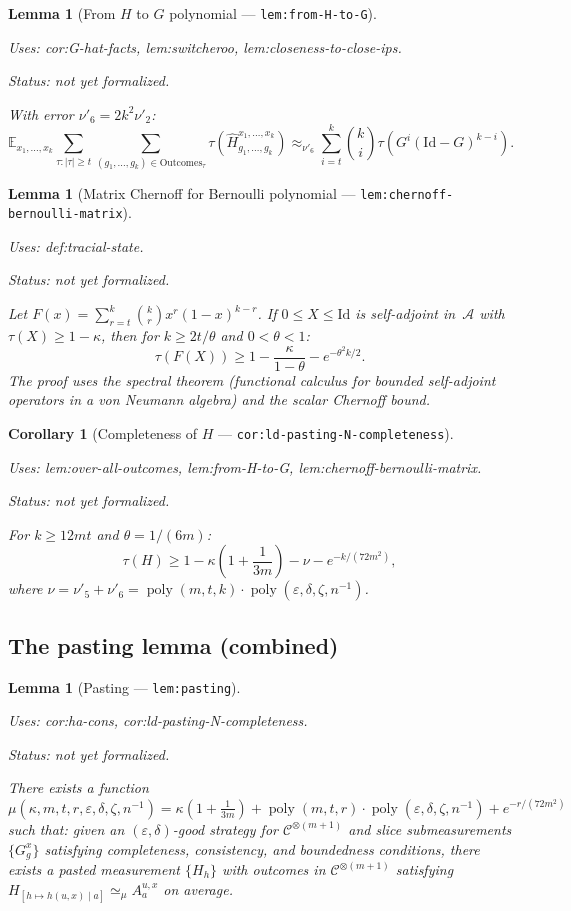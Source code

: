 \documentclass{article}
\providecommand{\uses}[1]{\par\smallskip\noindent\emph{Uses:} #1.\par\smallskip}
\providecommand{\notready}{\par\smallskip\noindent\emph{Status: not yet formalized.}\par\smallskip}
\newtheorem{lemma}[definition]{Lemma}
\newtheorem{corollary}[definition]{Corollary}
\theoremstyle{remark}
\newcommand{\E}{\mathbb{E}}
\newcommand{\id}{\mathrm{Id}}
\newcommand{\code}{\mathcal{C}}
\newcommand{\algebra}{\mathcal{A}}
\newcommand{\eps}{\varepsilon}
\begin{document}
\begin{lemma}[From $H$ to $G$ polynomial --- \texttt{lem:from-H-to-G}]
	\label{lem:from-H-to-G}
	\uses{cor:G-hat-facts, lem:switcheroo, lem:closeness-to-close-ips}
	\notready
	With error $\nu'_6=2k^2\nu'_2$:
	\[
		\E_{x_1,\dots,x_k}\sum_{\tau:|\tau|\ge t}
		\sum_{(g_1,\dots,g_k)\in\mathrm{Outcomes}_\tau}
		\tau\!(\widehat{H}^{x_1,\dots,x_k}_{g_1,\dots,g_k})
		\approx_{\nu'_6}
		\sum_{i=t}^k\binom{k}{i}\tau\!(G^i(\id-G)^{k-i}).
	\]
\end{lemma}

\begin{lemma}[Matrix Chernoff for Bernoulli polynomial --- \texttt{lem:chernoff-bernoulli-matrix}]
	\label{lem:chernoff-bernoulli-matrix}
	\uses{def:tracial-state}
	\notready
	Let $F(x)=\sum_{r=t}^k\binom{k}{r}x^r(1-x)^{k-r}$. If
	$0\le X\le\id$ is self-adjoint in~$\algebra$ with $\tau(X)\ge 1-\kappa$,
	then for $k\ge 2t/\theta$ and $0<\theta<1$:
	\[
		\tau(F(X))\ge 1-\frac\kappa{1-\theta}-e^{-\theta^2 k/2}.
	\]
	The proof uses the spectral theorem (functional calculus for bounded
	self-adjoint operators in a von Neumann algebra) and the scalar Chernoff bound.
\end{lemma}

\begin{corollary}[Completeness of $H$ --- \texttt{cor:ld-pasting-N-completeness}]
	\label{cor:ld-pasting-N-completeness}
	\uses{lem:over-all-outcomes, lem:from-H-to-G, lem:chernoff-bernoulli-matrix}
	\notready
	For $k\ge 12mt$ and $\theta=1/(6m)$:
	\[
		\tau(H)\ge 1-\kappa\!\left(1+\frac1{3m}\right)-\nu-e^{-k/(72m^2)},
	\]
	where $\nu=\nu'_5+\nu'_6=\operatorname{poly}(m,t,k)\cdot\operatorname{poly}(\eps,\delta,\zeta,n^{-1})$.
\end{corollary}

\subsection{The pasting lemma (combined)}

\begin{lemma}[Pasting --- \texttt{lem:pasting}]
	\label{lem:pasting}
	\uses{cor:ha-cons, cor:ld-pasting-N-completeness}
	\notready
	There exists a function
	$\mu(\kappa,m,t,r,\eps,\delta,\zeta,n^{-1})
		=\kappa(1+\frac{1}{3m})+\operatorname{poly}(m,t,r)\cdot\operatorname{poly}(\eps,\delta,\zeta,n^{-1})+e^{-r/(72m^2)}$
	such that: given an $(\eps,\delta)$-good strategy for $\code^{\otimes(m+1)}$
	and slice submeasurements $\{G^x_g\}$ satisfying completeness, consistency,
	and boundedness conditions, there exists a pasted measurement $\{H_h\}$
	with outcomes in $\code^{\otimes(m+1)}$ satisfying
	$H_{[h\mapsto h(u,x)\mid a]}\simeq_\mu A^{u,x}_a$ on average.
\end{lemma}
\end{document}
